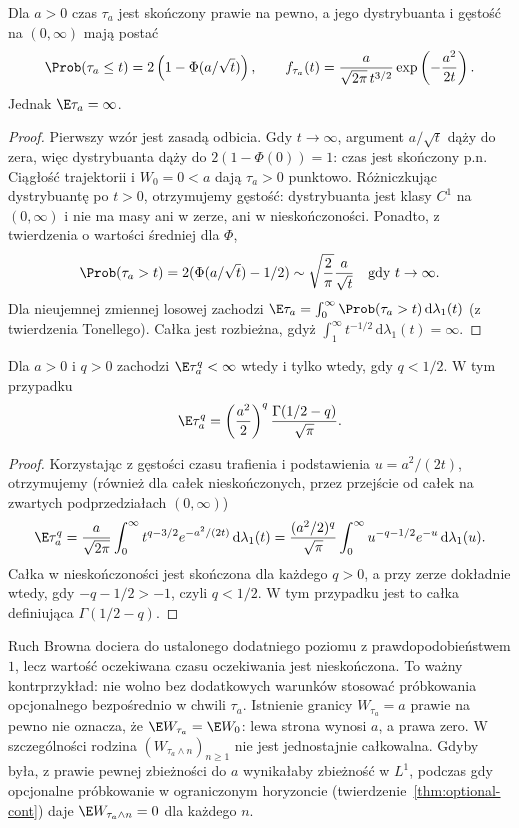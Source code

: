 \begin{wniosek}
Dla $a>0$ czas $\tau_a$ jest skończony prawie na pewno,
a jego dystrybuanta i gęstość na $(0,\infty)$ mają postać
\[
\Prob(\tau_a\le t)=2\left(1-\Phi(a/\sqrt t)\right),
\qquad
f_{\tau_a}(t)=\frac{a}{\sqrt{2\pi}\,t^{3/2}}
\exp\left(-\frac{a^2}{2t}\right).
\]
Jednak $\E\tau_a=\infty$.
\end{wniosek}
\begin{proof}
Pierwszy wzór jest zasadą odbicia. Gdy $t\to\infty$,
argument $a/\sqrt t$ dąży do zera, więc dystrybuanta
dąży do $2(1-\Phi(0))=1$: czas jest skończony p.n.
Ciągłość trajektorii i $W_0=0<a$ dają $\tau_a>0$
punktowo. Różniczkując dystrybuantę po $t>0$,
otrzymujemy gęstość: dystrybuanta jest klasy $C^1$
na $(0,\infty)$ i nie ma masy ani w zerze, ani
w nieskończoności.
Ponadto, z twierdzenia o wartości średniej dla $\Phi$,
\[
\Prob(\tau_a>t)=2(\Phi(a/\sqrt t)-1/2)
\sim \sqrt{\frac2\pi}\frac{a}{\sqrt t}
\quad\text{gdy }t\to\infty.
\]
Dla nieujemnej zmiennej losowej zachodzi
$\E\tau_a=\int_0^\infty\Prob(\tau_a>t)\,\mathrm d\lambda_1(t)$
(z twierdzenia Tonellego). Całka jest rozbieżna,
gdyż $\int_1^\infty t^{-1/2}\,\mathrm d\lambda_1(t)=\infty$.
\end{proof}

\begin{wniosek}
Dla $a>0$ i $q>0$ zachodzi
$\E\tau_a^q<\infty$ wtedy i tylko wtedy, gdy $q<1/2$.
W tym przypadku
\[
\E\tau_a^q
=\left(\frac{a^2}{2}\right)^q
\frac{\Gamma(1/2-q)}{\sqrt\pi}.
\]
\end{wniosek}
\begin{proof}
Korzystając z gęstości czasu trafienia i podstawienia
$u=a^2/(2t)$, otrzymujemy (również dla całek
nieskończonych, przez przejście od całek na zwartych
podprzedziałach $(0,\infty)$)
\[
\E\tau_a^q
=\frac{a}{\sqrt{2\pi}}\int_0^\infty
t^{q-3/2}e^{-a^2/(2t)}\,\mathrm d\lambda_1(t)
=\frac{(a^2/2)^q}{\sqrt\pi}
\int_0^\infty u^{-q-1/2}e^{-u}\,\mathrm d\lambda_1(u).
\]
Całka w nieskończoności jest skończona dla każdego
$q>0$, a przy zerze dokładnie wtedy, gdy
$-q-1/2>-1$, czyli $q<1/2$. W tym przypadku
jest to całka definiująca $\Gamma(1/2-q)$.
\end{proof}

\begin{uwaga}
Ruch Browna dociera do ustalonego dodatniego poziomu
z prawdopodobieństwem $1$, lecz wartość oczekiwana
czasu oczekiwania jest nieskończona.
To ważny kontrprzykład: nie wolno bez dodatkowych
warunków stosować próbkowania opcjonalnego bezpośrednio
w chwili $\tau_a$. Istnienie granicy $W_{\tau_a}=a$
prawie na pewno nie oznacza, że
$\E W_{\tau_a}=\E W_0$: lewa strona wynosi $a$,
a prawa zero. W szczególności rodzina
$(W_{\tau_a\wedge n})_{n\ge1}$ nie jest jednostajnie
całkowalna. Gdyby była, z prawie pewnej zbieżności
do $a$ wynikałaby zbieżność w $L^1$, podczas gdy
opcjonalne próbkowanie w ograniczonym horyzoncie
(twierdzenie~\ref{thm:optional-cont}) daje
$\E W_{\tau_a\wedge n}=0$ dla każdego $n$.
\end{uwaga}


